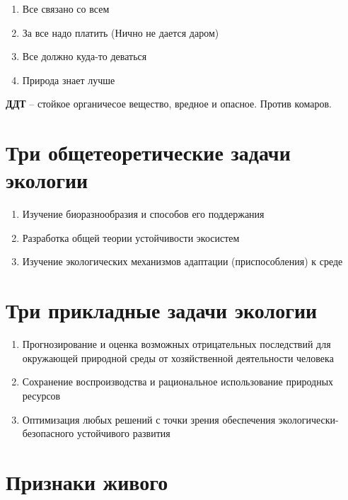 \begin{enumerate}
        \begin{enumerate}
            \item Все связано со всем
            \item За все надо платить (Нично не дается даром)
            \item Все должно куда-то деваться
            \item Природа знает лучше
        \end{enumerate}

        \textbf{ДДТ} -- стойкое органичесое вещество, вредное и опасное.
        Против комаров.
\end{enumerate}

\section{Три общетеоретические задачи экологии}

\begin{enumerate}
    \item Изучение биоразнообразия и способов его поддержания
    \item Разработка общей теории устойчивости экосистем
    \item Изучение экологических механизмов адаптации
        (приспособления) к среде
\end{enumerate}

\section{Три прикладные задачи экологии}

\begin{enumerate}
    \item Прогнозирование и оценка возможных отрицательных последствий
        для окружающей природной среды от хозяйственной
        деятельности человека

    \item Сохранение воспроизводства и рациональное
        использование природных ресурсов

    \item Оптимизация любых решений с точки зрения обеспечения
        экологически-безопасного устойчивого развития
\end{enumerate}

\section{Признаки живого}

